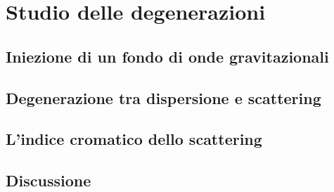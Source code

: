 
\chapter{Studio delle degenerazioni} \label{chpt:degenerazioni}
\sloppy

\section{Iniezione di un fondo di onde gravitazionali} \label{sec:iniezione_GWB}

\section{Degenerazione tra dispersione e scattering} \label{sec:DM_SV}

\section{L'indice cromatico dello scattering} \label{sec:alpha}

\section{Discussione} \label{sec:discussione}
